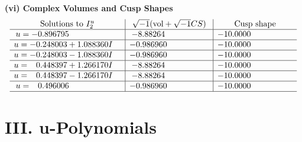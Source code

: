 \documentclass[1p]{elsarticle_modified}
\theoremstyle{definition}
\newcommand{\I}{\sqrt{-1}}
\begin{document}
\newpage\flushleft \textbf{(vi) Complex Volumes and Cusp Shapes}
$$\begin{array}{c|c|c}  
\text{Solutions to }I^u_{2}& \I (\text{vol} + \sqrt{-1}CS) & \text{Cusp shape}\\
 \hline 
\begin{aligned}
u &= -0.896795\phantom{ +0.000000I}\end{aligned}
 & -8.88264\phantom{ +0.000000I} & -10.0000\phantom{ +0.000000I} \\ \hline\begin{aligned}
u &= -0.248003 + 1.088360 I\end{aligned}
 & -0.986960\phantom{ +0.000000I} & -10.0000\phantom{ +0.000000I} \\ \hline\begin{aligned}
u &= -0.248003 - 1.088360 I\end{aligned}
 & -0.986960\phantom{ +0.000000I} & -10.0000\phantom{ +0.000000I} \\ \hline\begin{aligned}
u &= \phantom{-}0.448397 + 1.266170 I\end{aligned}
 & -8.88264\phantom{ +0.000000I} & -10.0000\phantom{ +0.000000I} \\ \hline\begin{aligned}
u &= \phantom{-}0.448397 - 1.266170 I\end{aligned}
 & -8.88264\phantom{ +0.000000I} & -10.0000\phantom{ +0.000000I} \\ \hline\begin{aligned}
u &= \phantom{-}0.496006\phantom{ +0.000000I}\end{aligned}
 & -0.986960\phantom{ +0.000000I} & -10.0000\phantom{ +0.000000I}\\
 \hline 
 \end{array}$$\newpage
\newpage\renewcommand{\arraystretch}{1}
\centering \section*{ III. u-Polynomials}
\end{document}
